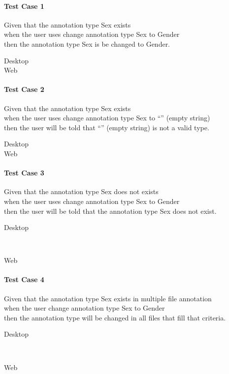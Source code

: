 \paragraph*{Test Case 1}
Given that the annotation type Sex exists \\ when the user uses change annotation type Sex to Gender \\ then the annotation type Sex is be changed to Gender.
\begin{description}
 \item[Desktop] \cmark
 \item[Web] \cmark
\end{description}
\paragraph*{Test Case 2}
Given that the annotation type Sex exists \\ when the user uses change annotation type Sex to “” (empty string) \\ then the user will be told that “” (empty string) is not a valid type.
\begin{description}
 \item[Desktop] \cmark
 \item[Web] \cmark
\end{description}
\paragraph*{Test Case 3}
Given that the annotation type Sex does not exists \\ when the user uses change annotation type Sex to Gender \\ then the user will be told that the annotation type Sex does not exist.
\begin{description}
 \item[Desktop] \xmark\ 
 \item[Web] \xmark
\end{description}
\paragraph*{Test Case 4}
Given that the annotation type Sex exists in multiple file annotation \\ when the user change annotation type Sex to Gender \\ then the annotation type will be changed in all files that fill that criteria.
\begin{description}
 \item[Desktop] \cmark\
 \item[Web] \cmark\
\end{description}


